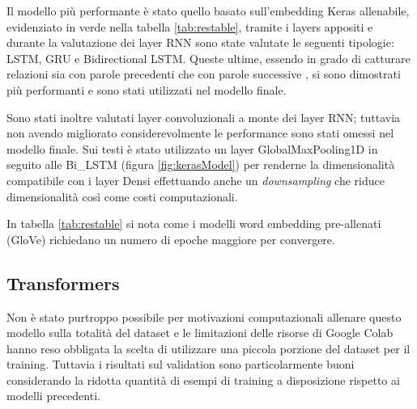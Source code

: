 
Il modello più performante è stato quello basato sull'embedding Keras
allenabile, evidenziato in verde nella tabella \ref{tab:restable},
tramite i layers appositi e durante la valutazione dei layer RNN sono state
valutate le seguenti tipologie: LSTM, GRU e Bidirectional LSTM. Queste ultime,
essendo in grado di catturare relazioni sia con parole precedenti che con parole
successive \cite{schuster1997bidirectional}, si sono dimostrati più performanti
e sono stati utilizzati nel modello finale.

Sono stati inoltre valutati layer convoluzionali a monte dei layer RNN; tuttavia
non avendo migliorato considerevolmente le performance sono stati omessi nel
modello finale.
Sui testi è stato utilizzato un layer GlobalMaxPooling1D in seguito alle
Bi\_LSTM (figura \ref{fig:kerasModel}) per renderne la dimensionalità compatibile con i layer Densi
effettuando anche un \textit{downsampling} che riduce dimensionalità così come
costi computazionali.

In tabella \ref{tab:restable} si nota come i modelli word embedding
pre-allenati (GloVe) richiedano un numero di epoche maggiore per convergere.


\subsection{Transformers}

Non è stato purtroppo possibile per motivazioni computazionali allenare questo
modello sulla totalità del dataset e le limitazioni delle risorse di Google
Colab hanno reso obbligata la scelta di utilizzare una piccola porzione del
dataset per il training. Tuttavia i risultati sul validation sono
particolarmente buoni considerando la ridotta quantità di esempi di training a
disposizione rispetto ai modelli precedenti.